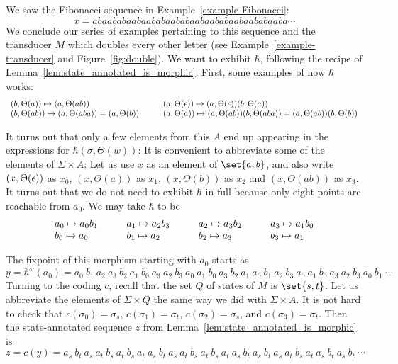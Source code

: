 \begin{example}[]
  We saw the Fibonacci sequence  in Example~\ref{example-Fibonacci}:
  $$x = abaababaabaababaababaabaababaabaababaaba\cdots$$
  We conclude our series of examples pertaining to this sequence
  and the transducer $M$
  which doubles every other letter (see Example~\ref{example-transducer} and Figure~\ref{fig:double}).
  We want to exhibit $\hbar$,
  following the recipe of Lemma~\ref{lem:state_annotated_is_morphic}.  First,  some examples of how $\hbar$ works:
  $$\begin{array}{l@{\hspace{.4in}}l}
    (b, \Theta(a)) \mapsto (a, \Theta(ab)) & (a, \Theta(\e)) \mapsto (a, \Theta(\e))(b, \Theta(a)) \\ 
    (b, \Theta(ab))  \mapsto (a, \Theta(aba)) = (a, \Theta(b)) & (a, \Theta(a)) \mapsto (a, \Theta(ab))(b, \Theta(aba)) = (a, \Theta(ab))(b, \Theta(b))
  \end{array}$$

  It turns out that only a few elements from this $A$ end up appearing in the expressions for
  $\hbar(\sigma, \Theta(w))$: 
  It is convenient to abbreviate some of the elements of $\Sigma\times A$:  
  Let us use $x$ as an element of $\set{a,b}$, and  also
  write 
  $(x,\Theta(\epsilon))$ as $x_0$, 
  $(x,\Theta(a))$ as $x_1$,
  $(x,\Theta(b))$ as $x_2$
  and $(x,\Theta(ab))$ as $x_3$.
  It turns out that we do not need to exhibit $\hbar$ in full because only eight points are reachable
  from $a_0$.
  We may take $\hbar$ to be 
  $$\begin{array}{l@{\hspace{.4in}}l@{\hspace{.4in}}l@{\hspace{.4in}}l}
    a_0 \mapsto a_0b_1 &  a_1  \mapsto  a_2 b_3 &  a_2  \mapsto a_3b_2 &  a_3   \mapsto a_1b_0 \\
    b_0  \mapsto a_0 &  b_1  \mapsto  a_2  & b_2  \mapsto a_3 &  b_3  \mapsto a_1
  \end{array}$$

  The fixpoint of this morphism starting with $a_0$ starts as $$ y = \hbar^\omega(a_0) = a_0 \ b_1 \ a_2 \ a_3 \ b_2 \ a_1 \ b_0 \ a_3 \ a_2 \ b_3 \ a_0 \ a_1 \ b_0 \ a_3 \ b_2 \ a_1 \ a_0 \ b_1 \ a_2 \ b_3 \ a_0 \ a_1 \ b_0 \ a_3 \ a_2 \ b_3 \ a_0 \ b_1 \  \cdots$$
  Turning to the coding $c$, recall that the set $Q$ of states of $M$ is $\set{s,t}$. 
  Let us abbreviate the elements of $\Sigma\times Q$ the same way we did
  with $\Sigma\times A$.   
  It is not hard to check that $c(\sigma_0) = \sigma_s$, $c(\sigma_1) = \sigma_t$,   
  $c(\sigma_2) = \sigma_s$, and
  $c(\sigma_3) = \sigma_t$.
  Then the state-annotated
  sequence $z$ from Lemma~\ref{lem:state_annotated_is_morphic} is
  $$z = c(y) = 
  a_s \ b_t \ a_s \ a_t \ b_s \ a_t \ b_s \ a_t \ a_s \ b_t \ a_s \ a_t \ b_s \ a_t \ b_s \ a_t \ a_s \ b_t \ a_s \ b_t \ a_s \ a_t \ b_s \ a_t \ a_s \ b_t \ a_s \ b_t \  \cdots$$



\end{example}
